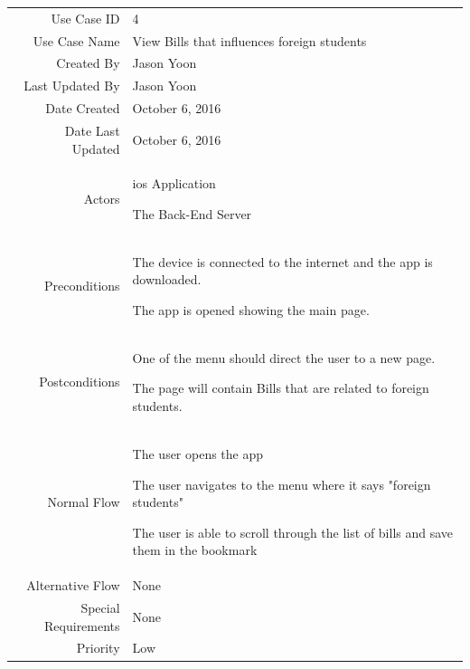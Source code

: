 \documentclass[12pt,oneside,letterpaper]{article}
\newenvironment{packed_enumerate}{
\begin{minipage}[t]{\linewidth}\begin{compactenum}[after=\strut]}
{\end{compactenum}\end{minipage}}
\begin{document}
\begin{longtable}{|r|p{3.8in}|}
\hline
Use Case ID & 4 \\
Use Case Name & View Bills that influences foreign students \\
Created By & Jason Yoon \\
Last Updated By & Jason Yoon \\
Date Created & October 6, 2016 \\
Date Last Updated & October 6, 2016 \\
Actors & 
\begin{packed_enumerate}
\item ios Application
\item The Back-End Server
\end{packed_enumerate}\\
Preconditions& 
\begin{packed_enumerate}
\item The device is connected to the internet and the app is downloaded.
\item The app is opened showing the main page.
\end{packed_enumerate}\\
Postconditions&
\begin{packed_enumerate}
\item One of the menu should direct the user to a new page.
\item The page will contain Bills that are related to foreign students.
\end{packed_enumerate}\\
Normal Flow &
\begin{packed_enumerate}
\item The user opens the app
\item The user navigates to the menu where it says "foreign students"
\item The user is able to scroll through the list of bills and save them in the bookmark
\end{packed_enumerate}\\
Alternative Flow & None \\
Special Requirements & None \\
Priority & Low \\
\hline
\end{longtable}
\end{document}
